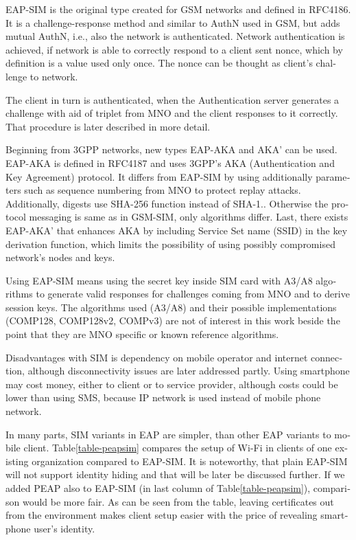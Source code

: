 \documentclass[12pt,a4paper,english]{tutthesis}
\begin{document}
\begin{otherlanguage}{english}
EAP-SIM is the original type created for GSM networks and defined 
in RFC4186\cite{rfc4186}.
It is a challenge-response method and similar to AuthN used in GSM, 
but adds mutual AuthN, i.e., also the network is authenticated.
Network authentication is achieved, if 
network is able to correctly respond to a client sent nonce,
which by definition is a value used only once. The nonce can
be thought as  client's challenge to network.

The client in  turn is authenticated, when the Authentication server
generates a challenge with aid of triplet from MNO and the client
responses to it correctly.
That procedure is later described in more detail.

Beginning from 3GPP networks, new types EAP-AKA and AKA' can be used.
EAP-AKA is defined in RFC4187\cite{rfc4187} and 
uses 3GPP's AKA (Authentication and Key Agreement) protocol.
It differs from EAP-SIM by using additionally parameters such as
sequence numbering from MNO to protect replay attacks. 
Additionally, digests use SHA-256 function instead of SHA-1.\cite{rfc5448}.
Otherwise the protocol messaging is same as in  GSM-SIM, only algorithms differ.
Last, there exists EAP-AKA' that enhances AKA by including Service Set name (SSID) 
in the key derivation function, which limits the possibility of using possibly
compromised network's nodes and keys. 


  Using EAP-SIM means using the secret key inside SIM card with A3/A8
algorithms to generate valid responses for challenges coming from MNO
and to derive session keys.  The algorithms used (A3/A8) and their
possible implementations (COMP128, COMP128v2, COMPv3) are not of
interest in this work beside the point that they are MNO specific or known reference algorithms.


Disadvantages with SIM is dependency on mobile operator and internet
connection, although disconnectivity issues are later addressed partly.
Using smartphone may cost money, either to client or to service
provider, although costs could be lower than using SMS, because 
IP network is used instead of mobile phone network.

In many parts, SIM variants in EAP are simpler, than other EAP
variants to mobile client.  Table\ref{table-peapsim} compares the setup of Wi-Fi
in clients of one existing organization compared to EAP-SIM. It
is noteworthy, that plain EAP-SIM will not support identity hiding and
that will be later be discussed further. If we added PEAP
also to EAP-SIM (in last column of Table\ref{table-peapsim}), comparison would be more fair.
As can be seen from the table, leaving certificates out from the environment
makes client setup easier with the price of revealing smartphone user's
identity.  








\end{otherlanguage}
\end{document}
